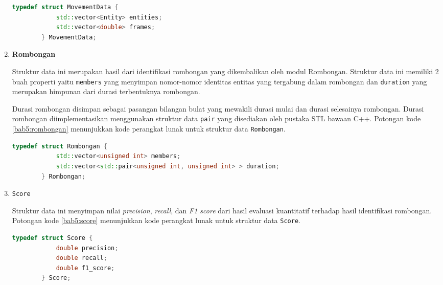 \begin{enumerate}
    \begin{lstlisting}[language=C++, caption=Implementasi \texttt{MovementData}, label={bab5:movement-data}]
        typedef struct MovementData {
            std::vector<Entity> entities;
            std::vector<double> frames;
        } MovementData;
    \end{lstlisting}
    
    \item \textbf{Rombongan}
    
    Struktur data ini merupakan hasil dari identifikasi rombongan yang dikembalikan oleh modul Rombongan. Struktur data ini memiliki 2 buah properti yaitu \texttt{members} yang menyimpan nomor-nomor identitas entitas yang tergabung dalam rombongan dan \texttt{duration} yang merupakan himpunan dari durasi terbentuknya rombongan.
    
    Durasi rombongan disimpan sebagai pasangan bilangan bulat yang mewakili durasi mulai dan durasi selesainya rombongan. Durasi rombongan diimplementasikan menggunakan struktur data \texttt{pair} yang disediakan oleh pustaka STL bawaan C++. Potongan kode \ref{bab5:rombongan} menunjukkan kode perangkat lunak untuk struktur data \texttt{Rombongan}.
    
    \begin{lstlisting}[language=C++, caption=Implementasi \texttt{Rombongan}, label={bab5:rombongan}]
        typedef struct Rombongan {
            std::vector<unsigned int> members;
            std::vector<std::pair<unsigned int, unsigned int> > duration;
        } Rombongan;
    \end{lstlisting}
    
    \item \texttt{Score}
    
    Struktur data ini menyimpan nilai \textit{precision}, \textit{recall}, dan \textit{F1 score} dari hasil evaluasi kuantitatif terhadap hasil identifikasi rombongan. Potongan kode \ref{bab5:score} menunjukkan kode perangkat lunak untuk struktur data \texttt{Score}.
    
    \begin{lstlisting}[language=C++, caption=Implementasi \texttt{Score}, label={bab5:score}]
        typedef struct Score {
            double precision;
            double recall;
            double f1_score;
        } Score;
    \end{lstlisting}
\end{enumerate}